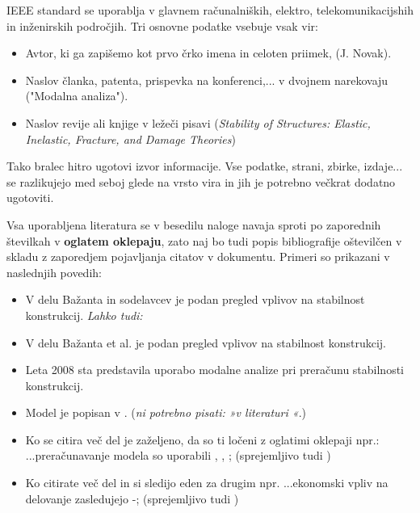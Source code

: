 IEEE standard se uporablja v glavnem računalniških, elektro, 
telekomunikacijshih in inženirskih področjih. Tri osnovne podatke vsebuje vsak 
vir:
\begin{itemize}
	\item Avtor, ki ga zapišemo kot prvo črko imena in celoten priimek, (J. 
	Novak).
	\item Naslov članka, patenta, prispevka na konferenci,...  v dvojnem 
	narekovaju ("Modalna analiza").
	\item Naslov revije ali knjige v ležeči pisavi (\emph{Stability of 
		Structures: Elastic, Inelastic, Fracture, and Damage Theories})
\end{itemize}
Tako bralec hitro ugotovi izvor informacije. Vse podatke, strani, zbirke, 
izdaje...  se razlikujejo med seboj glede na vrsto vira in jih je potrebno 
večkrat dodatno ugotoviti. 

Vsa uporabljena literatura se v besedilu naloge navaja sproti po zaporednih 
številkah v \textbf{oglatem oklepaju}, zato naj bo tudi popis bibliografije 
oštevilčen v skladu z zaporedjem pojavljanja citatov v dokumentu. Primeri so 
prikazani v naslednjih povedih:
\begin{itemize}
	\item V delu Bažanta in sodelavcev \cite{bazant_1991} je podan pregled 
	vplivov na stabilnost konstrukcij. \emph{Lahko tudi:}
	\item V delu Bažanta et al. \cite{bazant_1991} je podan pregled vplivov na
	stabilnost konstrukcij.
	\item Leta 2008 sta \citet{Bazant_2008} predstavila 
	uporabo modalne analize pri pre\-ra\-ču\-nu stabilnosti konstrukcij.
	\item Model je popisan v \cite{Doe_1991}. (\emph{ni potrebno pisati: »v 
		literaturi \cite{Doe_1991}«}.)
	\item Ko se citira več del je zaželjeno, da so ti ločeni z oglatimi 
	oklepaji npr.:  ...preračunavanje modela so uporabili \cite{bazant_1991}, 
	\cite{Doe_1991}, \cite{Bazant_2008}; (sprejemljivo tudi 
	\cite{bazant_1991,Doe_1991,Bazant_2008}) 
	\item Ko citirate več del in si sledijo eden za drugim npr. ...ekonomski 
	vpliv na delovanje zasledujejo \cite{bazant_1991}-\cite{Bazant_2008}; 
	(sprejemljivo tudi \cite{bazant_1991, stropnik_1997, 
		Doe_1991,Loukides_2020, Bazant_2008})
\end{itemize}


